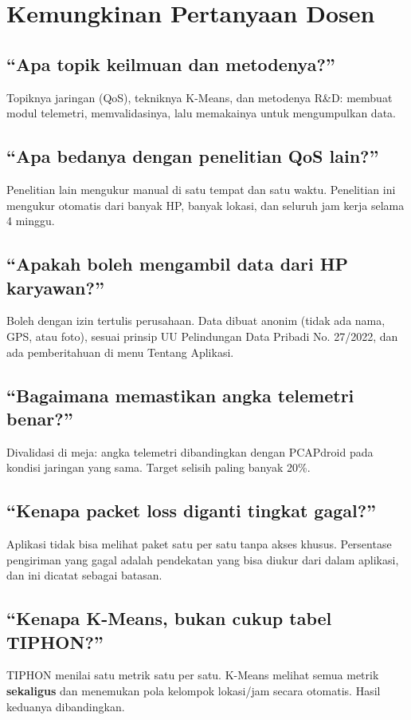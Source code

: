 \documentclass[11pt,a4paper]{article}
\begin{document}
\section{Kemungkinan Pertanyaan Dosen}
\subsection{``Apa topik keilmuan dan metodenya?''}
Topiknya jaringan (QoS), tekniknya K-Means, dan metodenya R\&D: membuat modul telemetri, memvalidasinya, lalu memakainya untuk mengumpulkan data.

\subsection{``Apa bedanya dengan penelitian QoS lain?''}
Penelitian lain mengukur manual di satu tempat dan satu waktu. Penelitian ini mengukur otomatis dari banyak HP, banyak lokasi, dan seluruh jam kerja selama 4 minggu.

\subsection{``Apakah boleh mengambil data dari HP karyawan?''}
Boleh dengan izin tertulis perusahaan. Data dibuat anonim (tidak ada nama, GPS, atau foto), sesuai prinsip UU Pelindungan Data Pribadi No. 27/2022, dan ada pemberitahuan di menu Tentang Aplikasi.

\subsection{``Bagaimana memastikan angka telemetri benar?''}
Divalidasi di meja: angka telemetri dibandingkan dengan PCAPdroid pada kondisi jaringan yang sama. Target selisih paling banyak 20\%.

\subsection{``Kenapa packet loss diganti tingkat gagal?''}
Aplikasi tidak bisa melihat paket satu per satu tanpa akses khusus. Persentase pengiriman yang gagal adalah pendekatan yang bisa diukur dari dalam aplikasi, dan ini dicatat sebagai batasan.

\subsection{``Kenapa K-Means, bukan cukup tabel TIPHON?''}
TIPHON menilai satu metrik satu per satu. K-Means melihat semua metrik \textbf{sekaligus} dan menemukan pola kelompok lokasi/jam secara otomatis. Hasil keduanya dibandingkan.
\end{document}
